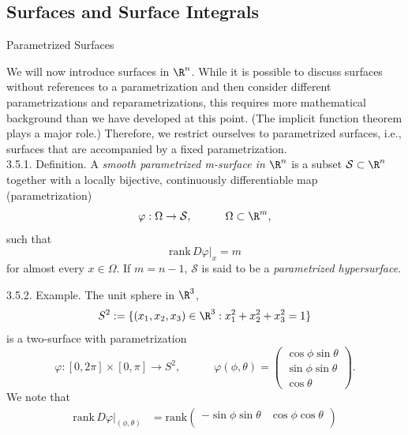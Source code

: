\documentclass[smaller,hyperref={CJKbookmarks=true}]{beamer}
\begin{document}
\subsection{Surfaces and Surface
Integrals}
\begin{frame}[c]
\begin{spacing}{2.5}
\tableofcontents[sectionstyle=hide,subsectionstyle=show/shaded/hide]
\end{spacing}
\end{frame}
\begin{frame}{Parametrized Surfaces}
\begin{spacing}{1}
We will now introduce surfaces in $\R^n$. While it is possible to discuss
surfaces without references to a parametrization and then consider
dif{}ferent parametrizations and reparametrizations, this requires more
mathematical background than we have developed at this point. (The
implicit function theorem plays a major role.) Therefore, we restrict
ourselves to parametrized surfaces, i.e., surfaces that are accompanied by a
fixed parametrization.\\[5pt]
\alert{3.5.1. Definition.} A \emph{smooth parametrized m-surface in $\R^n$} is a subset $\mathcal{S}\subset\R^n$ together with a locally bijective, continuously dif{}ferentiable map (parametrization)
\[\varphi:\Omega\to\mathcal{S},\qquad\quad
\Omega\subset\R^m,\]
such that
\[\text{rank}\,D\varphi|_x=m\]
for almost every $x\in\Omega$. If $m=n-1$, $\mathcal{S}$ is said to be a \emph{parametrized hypersurface}.
\end{spacing}
\newpage
\begin{spacing}{0.85}
\alert{3.5.2. Example.} The unit sphere in $\R^3$,
\[S^2:=\{(x_1,x_2,x_3)\in\R^3:x_1^2+x_2^2+x_3^2=1\}\]
is a two-surface with parametrization
\[\varphi:[0,2\pi]\times[0,\pi]\to S^2,\qquad\quad\varphi(\phi,\theta)=\begin{pmatrix}
                                      \cos\phi\sin\theta \\
                                      \sin\phi\sin\theta \\
                                      \cos\theta
                                    \end{pmatrix}.\]
We note that
\begin{equation*}
  \begin{split}
     \text{rank}\,D\varphi|_{(\phi,\theta)} &=\text{rank}\begin{pmatrix}
                    -\sin\phi\sin\theta & \cos\phi\cos\theta \\

\end{pmatrix}
\end{split}
\end{equation*}
\end{spacing}
\end{frame}
\end{document}
